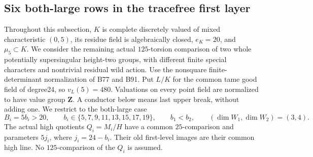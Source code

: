 \subsection{Six both-large rows in the tracefree first layer}

Throughout this subsection, $K$ is complete discretely valued of mixed
characteristic $(0,5)$, its residue field is algebraically closed,
$e_K=20$, and $\mu _5\subset K$. We consider the remaining actual
$125$-torsion comparison of two whole potentially supersingular
height-two groups, with different finite special characters and
nontrivial residual wild action. Use the nonsquare finite-determinant
normalization of B77 and B91. Put $L/K$ for the common tame good field
of degree24, so $v_L(5)=480$. Valuations on every point field are
normalized to have value group $\mathbf Z$. A conductor below means
last upper break, without adding one. We restrict to the both-large
case
\[
 B_i=5b_i>20,\qquad b_i\in\{5,7,9,11,13,15,17,19\},
 \qquad b_1<b_2,
 \qquad (\dim W_1,\dim W_2)=(3,4).                 \tag{B-RD94.1}
\]
The actual high quotients $Q_i=M_i/H$ have a common $25$-comparison
and parameters $5j_i$, where $j_i=24-b_i$. Their old first-level
images are their common high line. No $125$-comparison of the $Q_i$
is assumed.

